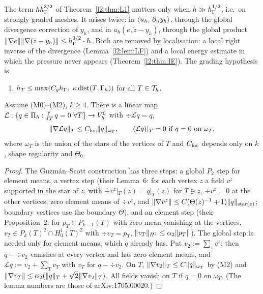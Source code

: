 The term $hh_\Gamma^{3/2}$ of Theorem~\ref{l2:thm:L1} matters only when $h\gg h_\Gamma^{1/2}$, i.e.\ on strongly graded meshes. It arises twice: in $\langle u_h,\, \partial_n y_h\rangle$, through the global divergence correction of $y_h$, and in $a_h(e,\tilde z-y_h)$, through the global product $\lVert \nabla e\rVert\lVert \nabla(\tilde z-y_h)\rVert\le h_\Gamma^{3/2}\cdot h$. Both are removed by localisation: a local right inverse of the divergence (Lemma~\ref{l2:lem:LF}) and a local energy estimate in which the pressure never appears (Theorem~\ref{l2:thm:IE}). The grading hypothesis is
\begin{enumerate}
\item[(G$_\kappa$)] $h_T\le\max(C_g\hG,\ \kappa\dist(T,\Gh))$ for all $T\in\mathcal T_h$.
\end{enumerate}

\begin{lemma}\label{l2:lem:LF}
Assume (M0)--(M2), $k\ge4$. There is a linear map $\mathcal L:\{q\in\Pi_h:\int_Tq=0\ \forall T\}\to V_h^0$ with $\div\mathcal Lq=q$,
\[
\lVert \nabla\mathcal Lq\rVert_T\le C_{\rm loc}\lVert q\rVert_{\omega_T},\qquad (\mathcal Lq)|_T=0\ \text{if } q=0 \text{ on }\omega_T,
\]
where $\omega_T$ is the union of the stars of the vertices of $T$ and $C_{\rm loc}$ depends only on $k$, shape regularity and $\Theta_0$.
\end{lemma}

\begin{proof}
The Guzm\'an--Scott construction \cite{GuzmanScott2019} has three steps: a global $P_2$ step for element means, a vertex step (their Lemma~6: for each vertex $z$ a field $v^z$ supported in the star of $z$, with $\div v^z|_T(z)=q|_T(z)$ for $T\ni z$, $\div v^z=0$ at the other vertices, zero element means of $\div v^z$, and $\lVert \nabla v^z\rVert\le C(\Theta(z)^{-1}+1)\lVert q\rVert_{\text{star}(z)}$; boundary vertices use the boundary $\Theta$), and an element step (their Proposition~2: for $p_T\in P_{k-1}(T)$ with zero mean vanishing at the vertices, $v_T\in P_k(T)^2\cap H^1_0(T)^2$ with $\div v_T=p_T$, $\lVert v_T\rVert_{H^1}\le\alpha_2\lVert p_T\rVert$). The global step is needed only for element means, which $q$ already has. Put $v_2:=\sum_zv^z$; then $q-\div v_2$ vanishes at every vertex and has zero element means, and $\mathcal Lq:=v_2+\sum_Tv_T$ with $v_T$ for $q-\div v_2$. On $T$, $\lVert \nabla v_2\rVert_T\le C\lVert q\rVert_{\omega_T}$ by (M2) and $\lVert \nabla v_T\rVert\le\alpha_2(\lVert q\rVert_T+\sqrt2\lVert \nabla v_2\rVert_T)$. All fields vanish on $T$ if $q=0$ on $\omega_T$. (The lemma numbers are those of arXiv:1705.00020.)
\end{proof}

